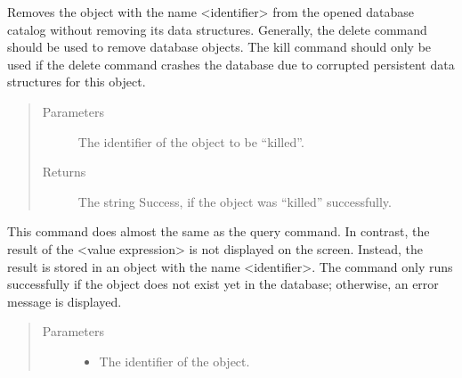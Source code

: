 \documentclass[letterpaper,10pt,english]{sphinxmanual}
\begin{document}
\begin{fulllineitems}
\begin{fulllineitems}
\end{fulllineitems}


\begin{fulllineitems}
\label{\detokenize{index:secondodb.api.secondoapi.Cursor.execute_kill}}
Removes the object with the name \textless{}identifier\textgreater{} from the opened database catalog without removing its data
structures. Generally, the delete command should be used to remove database objects. The kill command should
only be used if the delete command crashes the database due to corrupted persistent data structures for this
object.
\begin{quote}\begin{description}
\item[{Parameters}] \leavevmode
{} \textendash{} The identifier of the object to be “killed”.

\item[{Returns}] \leavevmode
The string Success, if the object was “killed” successfully.

\end{description}\end{quote}

\end{fulllineitems}


\begin{fulllineitems}
\label{\detokenize{index:secondodb.api.secondoapi.Cursor.execute_let}}
This command does almost the same as the query command. In contrast, the result of the \textless{}value expression\textgreater{} is not
displayed on the screen. Instead, the result is stored in an object with the name \textless{}identifier\textgreater{}. The command only
runs successfully if the object does not exist yet in the database; otherwise, an error message is displayed.
\begin{quote}\begin{description}
\item[{Parameters}] \leavevmode\begin{itemize}
\item {} 
 \textendash{} The identifier of the object.


\end{itemize}
\end{description}
\end{quote}
\end{fulllineitems}
\end{fulllineitems}
\end{document}
